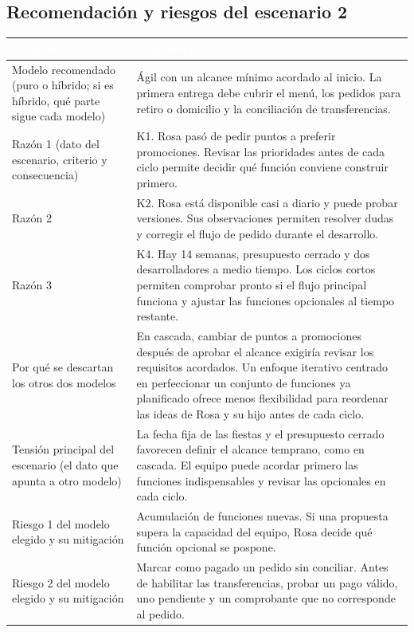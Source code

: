 \subsection{Recomendación y riesgos del escenario 2}

\begin{center}
\small
\begin{tabularx}{\textwidth}{|>{\raggedright\arraybackslash}p{4.5cm}|L|}
\hline
{}
\textcolor{white}{\textbf{Elemento}}
& \textcolor{white}{\textbf{Respuesta}} \\ \hline
Modelo recomendado (puro o híbrido; si es híbrido, qué parte sigue cada modelo)
& Ágil con un alcance mínimo acordado al inicio. La primera entrega debe cubrir el menú, los pedidos para retiro o domicilio y la conciliación de transferencias.
\\ \hline
Razón 1 (dato del escenario, criterio y consecuencia)
& K1. Rosa pasó de pedir puntos a preferir promociones. Revisar las prioridades antes de cada ciclo permite decidir qué función conviene construir primero.
\\ \hline
Razón 2
& K2. Rosa está disponible casi a diario y puede probar versiones. Sus observaciones permiten resolver dudas y corregir el flujo de pedido durante el desarrollo.
\\ \hline
Razón 3
& K4. Hay 14 semanas, presupuesto cerrado y dos desarrolladores a medio tiempo. Los ciclos cortos permiten comprobar pronto si el flujo principal funciona y ajustar las funciones opcionales al tiempo restante.
\\ \hline
Por qué se descartan los otros dos modelos
& En cascada, cambiar de puntos a promociones después de aprobar el alcance exigiría revisar los requisitos acordados. Un enfoque iterativo centrado en perfeccionar un conjunto de funciones ya planificado ofrece menos flexibilidad para reordenar las ideas de Rosa y su hijo antes de cada ciclo.
\\ \hline
Tensión principal del escenario (el dato que apunta a otro modelo)
& La fecha fija de las fiestas y el presupuesto cerrado favorecen definir el alcance temprano, como en cascada. El equipo puede acordar primero las funciones indispensables y revisar las opcionales en cada ciclo.
\\ \hline
Riesgo 1 del modelo elegido y su mitigación
& Acumulación de funciones nuevas. Si una propuesta supera la capacidad del equipo, Rosa decide qué función opcional se pospone.
\\ \hline
Riesgo 2 del modelo elegido y su mitigación
& Marcar como pagado un pedido sin conciliar. Antes de habilitar las transferencias, probar un pago válido, uno pendiente y un comprobante que no corresponde al pedido.
\\ \hline
\end{tabularx}
\end{center}